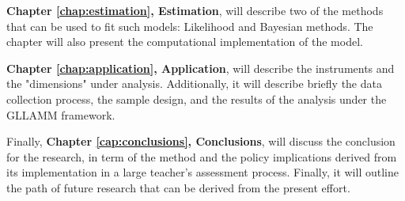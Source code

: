 \textbf{Chapter \ref{chap:estimation}, Estimation}, will describe {\color{red} two} of the methods that can be used to fit such models: {\color{red} Likelihood and Bayesian methods}. The chapter will also present the computational implementation of the model.

\textbf{Chapter \ref{chap:application}, Application}, will describe the instruments and the "dimensions" under analysis. Additionally, it will describe briefly the data collection process, the sample design, and the results of the analysis under the GLLAMM framework.

Finally, \textbf{Chapter \ref{cap:conclusions}, Conclusions}, will discuss the conclusion for the research, in term of the method and the policy implications derived from its implementation in a large teacher's assessment process. Finally, it will outline the path of future research that can be derived from the present effort.